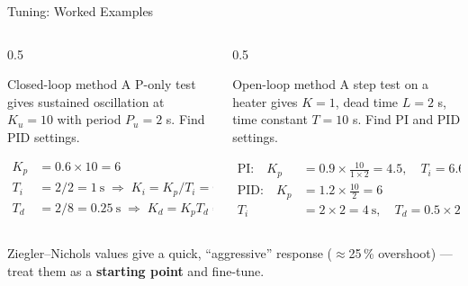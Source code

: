 \documentclass[aspectratio=169]{beamer}
\begin{document}
	\begin{frame}{Tuning: Worked Examples}
		\begin{columns}[T]
			\begin{column}{0.5\textwidth}
				\begin{block}{Closed-loop method}
					\small A P-only test gives sustained oscillation at $K_u = 10$ with period $P_u = 2$ s. Find PID settings.
				\end{block}
				\small
				\begin{align*}
					K_p &= 0.6\times10 = \boxed{6}\\
					T_i &= 2/2 = 1\ \text{s} \;\Rightarrow\; K_i = K_p/T_i = 6\ \text{s}^{-1}\\
					T_d &= 2/8 = 0.25\ \text{s} \;\Rightarrow\; K_d = K_p T_d = 1.5\ \text{s}
				\end{align*}
			\end{column}
			\begin{column}{0.5\textwidth}
				\begin{block}{Open-loop method}
					\small A step test on a heater gives $K = 1$, dead time $L = 2$ s, time constant $T = 10$ s. Find PI and PID settings.
				\end{block}
				\small
				\begin{align*}
					\text{PI:}\quad K_p &= 0.9\times\tfrac{10}{1\times2} = \boxed{4.5},\quad T_i = 6.67\ \text{s}\\
					\text{PID:}\quad K_p &= 1.2\times\tfrac{10}{2} = \boxed{6}\\
					T_i &= 2\times2 = 4\ \text{s},\quad T_d = 0.5\times2 = 1\ \text{s}
				\end{align*}
			\end{column}
		\end{columns}
		\vspace{0.2cm}
		\footnotesize\centering Ziegler--Nichols values give a quick, ``aggressive'' response ($\approx$25\,\% overshoot) --- treat them as a \textbf{starting point} and fine-tune.
	\end{frame}
\end{document}
